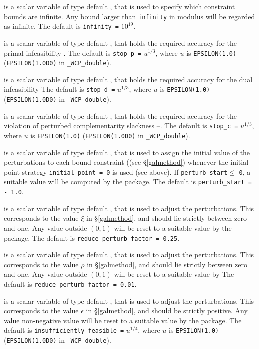 \documentclass{galahad}
\newcommand{\packagename}{WCP}
\newcommand{\fullpackagename}{\libraryname\_\-\packagename}
\begin{document}
\begin{description}
 is a scalar variable of type default \realdp, that is used to
specify which constraint bounds are infinite.
Any bound larger than {\tt infinity} in modulus will be regarded as infinite.
The default is {\tt infinity =} $10^{19}$.

 is a scalar variable of type default \realdp, that holds the
required accuracy for the primal infeasibility .
The default is {\tt stop\_p =} $u^{1/3}$,
where $u$ is {\tt EPSILON(1.0)} ({\tt EPSILON(1.0D0)} in 
{\tt \fullpackagename\_double}).

 is a scalar variable of type default 
\realdp, that holds the
required accuracy for the dual infeasibility 
The default is {\tt stop\_d =} $u^{1/3}$,
where $u$ is {\tt EPSILON(1.0)} ({\tt EPSILON(1.0D0)} in 
{\tt \fullpackagename\_double}).

 is a scalar variable of type default 
\realdp, that holds the
required accuracy for the violation of perturbed complementarity slackness 
--.
The default is {\tt stop\_c =} $u^{1/3}$,
where $u$ is {\tt EPSILON(1.0)} ({\tt EPSILON(1.0D0)} in 
{\tt \fullpackagename\_double}).

 is a scalar variable of type default \realdp, 
that is used to assign the initial value of the perturbations
to each bound constraint ((see \S\ref{galmethod}) 
whenever the initial point strategy {\tt initial\_point = 0} is used (see above).
If {\tt perturb\_start}$\leq$ {\tt 0}, a suitable value will be
computed by the package. The default is {\tt perturb\_start = - 1.0}.

 is a scalar variable of type default \realdp, 
that is used to adjust the perturbations. This corresponds to the
value $\xi$ in \S\ref{galmethod}, and should lie strictly between zero and
one. Any value outside $(0,1)$ will be reset to a suitable value by
the package. The default is {\tt reduce\_perturb\_factor = 0.25}.

 is a scalar variable of type default \realdp, 
that is used to adjust the perturbations. This corresponds to the
value $\rho$ in \S\ref{galmethod}, and should lie strictly between zero and
one. Any value outside $(0,1)$ will be reset to a suitable value by
The default is {\tt reduce\_perturb\_factor = 0.01}.

 is a scalar variable of type default \realdp, 
that is used to adjust the perturbations. This corresponds to the
value $\epsilon$ in \S\ref{galmethod}, and should be strictly positive.
Any value non-negative value will be reset to a suitable value by the package.
The default is {\tt insufficiently\_fe\-asible =} $u^{1/4}$,
where $u$ is {\tt EPSILON(1.0)} ({\tt EPSILON(1.0D0)} in 
{\tt \fullpackagename\_double}).


\end{description}
\end{document}
